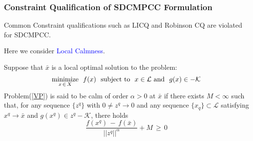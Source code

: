 \documentclass{beamer}
\newcommand{\tblue}{\textcolor{blue}}
\newcommand{\tmag}{\textcolor{magenta}}
\begin{document}
%
%
%
%

\begin{frame}
\frametitle{Constraint Qualification of SDCMPCC Formulation}
Common Constraint qualifications such as LICQ and Robinson CQ are violated for SDCMPCC.

\bigskip
Here we consider \tblue{Local Calmness}.


\begin{definition}
Suppose that $\bar{x}$ is a local optimal solution to the problem:
\begin{equation}\label{VP}
\displaystyle{
{\operatornamewithlimits{\mbox{minimize}}_{x \, \in \,X}}}  ~~f(x) ~~
\mbox{subject to} ~~ x \in \mathcal{L}~\mbox{and}~~g(x) \in -\mathcal{K}
\end{equation}
 Problem(\ref{VP}) is said to be calm of order $\alpha >0$ at $\bar{x}$ if there exists $M<\infty$ such that, for any sequence $\{z^q\}$ with $0\neq z^q\rightarrow 0$ and any sequence $\{x_q\}\subset \mathcal{L}$ satisfying $x^q\rightarrow \bar{x}$ and $g(x^q)\in z^q -\mathcal{K}$, there holds
\begin{equation}
\frac{f(x^q)\,-\,f(\bar{x})}{||z^q||^{\alpha}}+M \,\geq\,0
\end{equation} 
\end{definition}
%
\end{frame}
\end{document}
